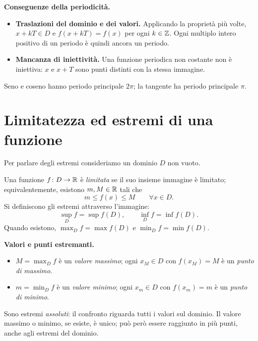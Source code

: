 \textbf{Conseguenze della periodicità.}
\begin{itemize}
  \item \textbf{Traslazioni del dominio e dei valori.} Applicando la proprietà più volte, $x+kT\in D$ e $f(x+kT)=f(x)$ per ogni $k\in\mathbb{Z}$. Ogni multiplo intero positivo di un periodo è quindi ancora un periodo.
  \item \textbf{Mancanza di iniettività.} Una funzione periodica non costante non è iniettiva: $x$ e $x+T$ sono punti distinti con la stessa immagine.
\end{itemize}
\begin{esempio}
Seno e coseno hanno periodo principale $2\pi$; la tangente ha periodo principale $\pi$.
\end{esempio}

\section{Limitatezza ed estremi di una funzione}

Per parlare degli estremi consideriamo un dominio $D$ non vuoto.

\begin{definizione}
Una funzione $f\colon D\to\mathbb{R}$ è \emph{limitata} se il suo insieme immagine è limitato; equivalentemente, esistono $m,M\in\mathbb{R}$ tali che
\[
m\le f(x)\le M\qquad\forall x\in D.
\]
Si definiscono gli estremi attraverso l'immagine:
\[
\sup_D f=\sup f(D),\qquad \inf_D f=\inf f(D).
\]
Quando esistono, $\max_D f=\max f(D)$ e $\min_D f=\min f(D)$.
\end{definizione}

\textbf{Valori e punti estremanti.}
\begin{itemize}
  \item $M=\max_D f$ è un \emph{valore massimo}; ogni $x_M\in D$ con $f(x_M)=M$ è un \emph{punto di massimo}.
  \item $m=\min_D f$ è un \emph{valore minimo}; ogni $x_m\in D$ con $f(x_m)=m$ è un \emph{punto di minimo}.
\end{itemize}
Sono estremi \emph{assoluti}: il confronto riguarda tutti i valori sul dominio. Il valore massimo o minimo, se esiste, è unico; può però essere raggiunto in più punti, anche agli estremi del dominio.


